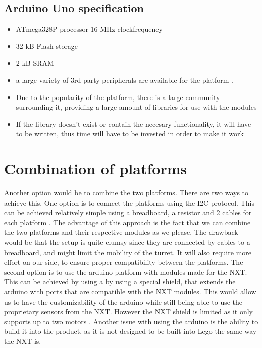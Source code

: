 \subsection{Arduino Uno specification}\citep{UNOSpecs}
\begin{itemize}
  \item ATmega328P processor 16 MHz clockfrequency
  \item 32 kB Flash storage
  \item 2 kB SRAM
\end{itemize}

\begin{itemize}
	\item a large variety of 3rd party peripherals are available for the platform
	\citep{ArduinoComponents}.
	\item Due to the popularity of the platform, there is a large community surrounding it,
    providing a large amount of libraries for use with the modules 
	\item If the library doesn't exist or contain the necesary functionality, it
	will have to be written, thus time will have to be invested in order to make
	it work
\end{itemize}

\section{Combination of platforms}
Another option would be to combine the two platforms. There are two ways to achieve this.
One option is to connect the platforms using the I2C protocol. This can be achieved relatively
simple using a breadboard, a resistor and 2 cables for each platform \citep{ArduinoNXT}. The advantage of this
approach is the fact that we can combine the two platforms and their respective modules as we please.
The drawback would be that the setup is quite clumsy since they are connected by cables to a breadboard,
and might limit the mobility of the turret. It will also require more effort on our side, to ensure proper
compatibility between the platforms.
The second option is to use the arduino platform with modules made for the NXT.
This can be achieved by using a by using a special shield, that extends the arduino with
ports that are compatible with the NXT modules. This would allow us to have the customizability of the arduino
while still being able to use the proprietary sensors from the NXT. However the
NXT shield is limited as it only supports up to two motors \citep{NXTShield}. Another issue with
using the arduino is the ability to build it into the product, as it is not
designed to be built into Lego the same way the NXT is.\nl

